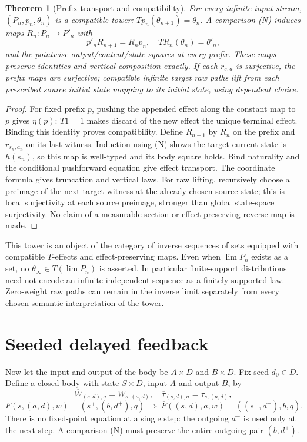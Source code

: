 \documentclass[11pt]{article}
\newtheorem{theorem}{Theorem}\newtheorem{proposition}{Proposition}\newtheorem{definition}{Definition}
\begin{document}
\begin{theorem}[Prefix transport and compatibility]
For every infinite input stream, $(P_n,p_n,\theta_n)$ is a compatible tower:
$T p_n(\theta_{n+1})=\theta_n$.
A comparison (N) induces maps $R_n:P_n\to P'_n$ with
\[
 p'_nR_{n+1}=R_np_n,\quad T R_n(\theta_n)=\theta'_n,
\]
and the pointwise output/content/state squares at every prefix. These maps preserve identities and vertical composition exactly. If each $r_{s,a}$ is surjective, the prefix maps are surjective; compatible infinite target raw paths lift from each prescribed source initial state mapping to its initial state, using dependent choice.
\end{theorem}
\begin{proof}
For fixed prefix $p$, pushing the appended effect along the constant map to $p$ gives $\eta(p)$: $T1=1$ makes discard of the new effect the unique terminal effect. Binding this identity proves compatibility. Define $R_{n+1}$ by $R_n$ on the prefix and $r_{s_n,a_n}$ on its last witness. Induction using (N) shows the target current state is $h(s_n)$, so this map is well-typed and its body square holds. Bind naturality and the conditional pushforward equation give effect transport. The coordinate formula gives truncation and vertical laws. For raw lifting, recursively choose a preimage of the next target witness at the already chosen source state; this is local surjectivity at each source preimage, stronger than global state-space surjectivity. No claim of a measurable section or effect-preserving reverse map is made.
\end{proof}

This tower is an object of the category of inverse sequences of sets equipped with compatible $T$-effects and effect-preserving maps. Even when $\lim P_n$ exists as a set, no $\theta_\infty\in T(\lim P_n)$ is asserted. In particular finite-support distributions need not encode an infinite independent sequence as a finitely supported law. Zero-weight raw paths can remain in the inverse limit separately from every chosen semantic interpretation of the tower.

\section{Seeded delayed feedback}
Now let the input and output of the body be $A\times D$ and $B\times D$. Fix seed $d_0\in D$. Define a closed body with state $S\times D$, input $A$ and output $B$, by
\[
 \overline W_{(s,d),a}=W_{s,(a,d)},\quad
 \overline\tau_{(s,d),a}=\tau_{s,(a,d)},
\]
\[
 F(s,(a,d),w)=(s^+,(b,d^+),q)
 \ \Longrightarrow\ 
 \overline F((s,d),a,w)=((s^+,d^+),b,q).
\]
There is no fixed-point equation at a single step: the outgoing $d^+$ is used only at the next step. A comparison (N) must preserve the entire outgoing pair $(b,d^+)$.
\end{document}

